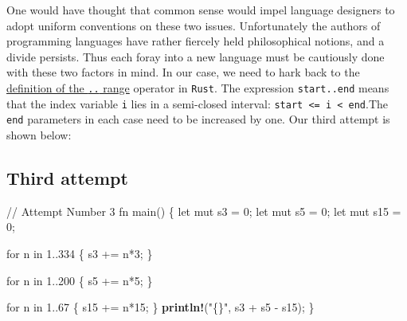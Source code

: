 \documentclass[
  a4paper,
]{article}
\newenvironment{Shaded}{\begin{snugshade}}{\end{snugshade}}
\newcommand{\CommentTok}[1]{\textcolor[rgb]{0.50,0.62,0.50}{#1}}
\newcommand{\ControlFlowTok}[1]{\textcolor[rgb]{0.94,0.87,0.69}{#1}}
\newcommand{\DecValTok}[1]{\textcolor[rgb]{0.86,0.86,0.80}{#1}}
\newcommand{\KeywordTok}[1]{\textcolor[rgb]{0.94,0.87,0.69}{#1}}
\newcommand{\NormalTok}[1]{\textcolor[rgb]{0.80,0.80,0.80}{#1}}
\newcommand{\OperatorTok}[1]{\textcolor[rgb]{0.94,0.94,0.82}{#1}}
\newcommand{\PreprocessorTok}[1]{\textcolor[rgb]{1.00,0.81,0.69}{\textbf{#1}}}
\newcommand{\StringTok}[1]{\textcolor[rgb]{0.80,0.58,0.58}{#1}}
\begin{document}
One would have thought that common sense would impel language designers
to adopt uniform conventions on these two issues. Unfortunately the
authors of programming languages have rather fiercely held philosophical
notions, and a divide persists. Thus each foray into a new language must
be cautiously done with these two factors in mind. In our case, we need
to hark back to the
\href{https://doc.rust-lang.org/reference/expressions/range-expr.html}{definition
of the \texttt{..} range} operator in \texttt{Rust}. The expression
\texttt{start..end} means that the index variable \texttt{i} lies in a
semi-closed interval:
\texttt{start\ \textless{}=\ i\ \textless{}\ end}.The \texttt{end}
parameters in each case need to be increased by one. Our third attempt
is shown below:

\hypertarget{third-attempt}{%
\subsection{Third attempt}\label{third-attempt}}

\begin{Shaded}
\begin{Highlighting}[]
 \CommentTok{// Attempt Number 3}
\KeywordTok{fn}\NormalTok{ main() }\OperatorTok{\{}
  \KeywordTok{let} \KeywordTok{mut}\NormalTok{ s3 }\OperatorTok{=} \DecValTok{0}\OperatorTok{;}
  \KeywordTok{let} \KeywordTok{mut}\NormalTok{ s5 }\OperatorTok{=} \DecValTok{0}\OperatorTok{;}
  \KeywordTok{let} \KeywordTok{mut}\NormalTok{ s15 }\OperatorTok{=} \DecValTok{0}\OperatorTok{;}

  \ControlFlowTok{for}\NormalTok{ n }\KeywordTok{in} \DecValTok{1}\OperatorTok{..}\DecValTok{334} \OperatorTok{\{}
\NormalTok{    s3 }\OperatorTok{+=}\NormalTok{ n}\OperatorTok{*}\DecValTok{3}\OperatorTok{;}
  \OperatorTok{\}}

  \ControlFlowTok{for}\NormalTok{ n }\KeywordTok{in} \DecValTok{1}\OperatorTok{..}\DecValTok{200} \OperatorTok{\{}
\NormalTok{    s5 }\OperatorTok{+=}\NormalTok{ n}\OperatorTok{*}\DecValTok{5}\OperatorTok{;}
  \OperatorTok{\}}

  \ControlFlowTok{for}\NormalTok{ n }\KeywordTok{in} \DecValTok{1}\OperatorTok{..}\DecValTok{67} \OperatorTok{\{}
\NormalTok{    s15 }\OperatorTok{+=}\NormalTok{ n}\OperatorTok{*}\DecValTok{15}\OperatorTok{;}
  \OperatorTok{\}}
  \PreprocessorTok{println!}\NormalTok{(}\StringTok{"\{\}"}\OperatorTok{,}\NormalTok{ s3 }\OperatorTok{+}\NormalTok{ s5 }\OperatorTok{{-}}\NormalTok{ s15)}\OperatorTok{;}
  \OperatorTok{\}}
\end{Highlighting}
\end{Shaded}
\end{document}
